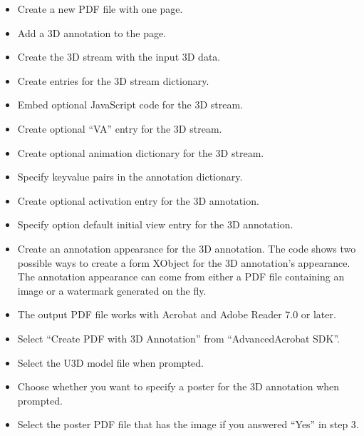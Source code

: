 \documentclass[letterpaper,12pt,english,openany,oneside]{sphinxmanual}
\begin{document}
\label{\detokenize{Samples_Plug_in:implementation-details-1}}
\begin{itemize}
\item {} 
Create a new PDF file with one page.

\item {} 
Add a 3D annotation to the page.

\item {} 
Create the 3D stream with the input 3D data.

\item {} 
Create entries for the 3D stream dictionary.

\item {} 
Embed optional JavaScript code for the 3D stream.

\item {} 
Create optional “VA” entry for the 3D stream.

\item {} 
Create optional animation dictionary for the 3D stream.

\item {} 
Specify key\sphinxhyphen{}value pairs in the annotation dictionary.

\item {} 
Create optional activation entry for the 3D annotation.

\item {} 
Specify option default initial view entry for the 3D annotation.

\item {} 
Create an annotation appearance for the 3D annotation. The code shows two possible ways to create a form XObject for the 3D annotation’s appearance. The annotation appearance can come from either a PDF file containing an image or a watermark generated on the fly.

\item {} 
The output PDF file works with Acrobat and Adobe Reader 7.0 or later.

\end{itemize}
\label{\detokenize{Samples_Plug_in:usage-4}}
\begin{itemize}
\item {} 
Select “Create PDF with 3D Annotation” from “Advanced\sphinxhyphen{}Acrobat SDK”.

\item {} 
Select the U3D model file when prompted.

\item {} 
Choose whether you want to specify a poster for the 3D annotation when prompted.

\item {} 
Select the poster PDF file that has the image if you answered “Yes” in step 3.

\end{itemize}
\end{document}
